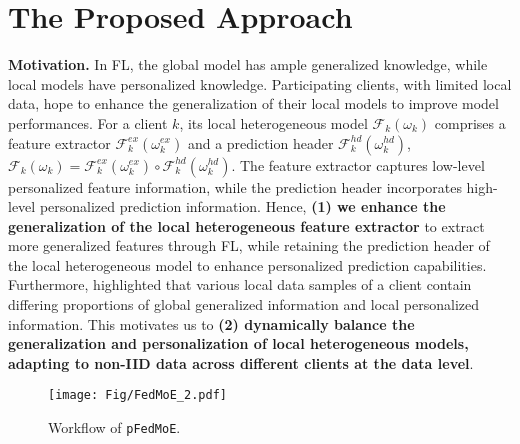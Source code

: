 \documentclass[sigconf]{acmart}
\newcommand{\hetero}{heterogeneous }
\newcommand{\pers}{personalized }
\newcommand{\gen}{generalized }
\newcommand{\persN}{personalization }
\newcommand{\genN}{generalization }
\newcommand{\methodname}{{\tt{pFedMoE}}}
\begin{document}
\section{The Proposed Approach}
\textbf{Motivation.} In FL, the global model has ample \gen knowledge, while local models have \pers knowledge. Participating clients, with limited local data, hope to enhance the generalization of their local models to improve model performances. For a client $k$, its local \hetero model $\mathcal{F}_k(\omega_k)$ comprises a feature extractor $\mathcal{F}_k^{ex}(\omega_k^{ex})$ and a prediction header $\mathcal{F}_k^{hd}(\omega_k^{hd})$, $\mathcal{F}_k(\omega_k)=\mathcal{F}_k^{ex}(\omega_k^{ex})\circ\mathcal{F}_k^{hd}(\omega_k^{hd})$. The feature extractor captures low-level \pers feature information, while the prediction header incorporates high-level \pers prediction information. 
Hence, \textbf{(1) we enhance the generalization of the local heterogeneous feature extractor} to extract more generalized features through FL, while retaining the prediction header of the local \hetero model to enhance \pers prediction capabilities.
Furthermore, \citet{FedCP} highlighted that various local data samples of a client contain differing proportions of global \gen information and local \pers information. This motivates us to \textbf{(2) dynamically balance the \genN and \persN of local \hetero models, adapting to non-IID data across different clients at the data level}.


\begin{figure}[t]
\centering
\texttt{[image: Fig/FedMoE\_2.pdf]}
\vspace{-1em}
\caption{Workflow of \methodname{}.}
\label{fig:FedMoE}
\vspace{-1em}
\end{figure}
\end{document}
